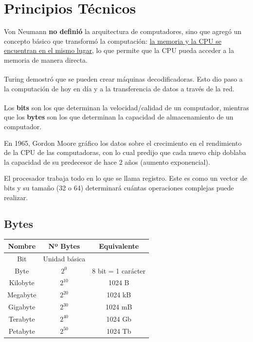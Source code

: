 \documentclass{templateNote}
\begin{document}
\section{Principios Técnicos}
\noindent Von Neumann \textbf{no definió} la arquitectura de computadores, sino que agregó un concepto básico que transformó la computación: \underline{la memoria y la CPU se encuentran en el mismo lugar}, lo que permite que la CPU pueda acceder a la memoria de manera directa. 
\\\\
Turing demostró que se pueden crear máquinas decodificadoras. Esto dio paso a la computación de hoy en día y a la transferencia de datos a través de la red.
\\\\
Los \textbf{bits} son los que determinan la velocidad/calidad de un computador, mientras que los \textbf{bytes} son los que determinan la capacidad de almacenamiento de un computador.

\begin{tcolorbox}[colback=blue!5!white,colframe=blue!75!black,title=Ley de Moore]
En 1965, Gordon Moore gráfico los datos sobre el crecimiento en el rendimiento de la CPU de las computadoras, con lo cual predijo que cada nuevo chip doblaba la capacidad de su predecesor de hace 2 años (aumento exponencial).
\end{tcolorbox}

\noindent El procesador trabaja todo en lo que se llama registro. Este es como un vector de bits y su tamaño (32 o 64) determinará cuántas operaciones complejas puede realizar.

\subsection{Bytes}
\begin{table} [H]
    \centering
        \renewcommand{\arraystretch}{1.5} %
        \begin{tabular}{|c|c|c|}
            \hline
            \textbf{Nombre} & \textbf{Nº Bytes} & \textbf{Equivalente}\\
            \hline
            Bit & Unidad básica &\\
            \hline
            Byte & $\displaystyle 2^0$ & 8 bit = 1 carácter \\
            \hline
            Kilobyte & $\displaystyle 2^{10}$ & 1024 B \\
            \hline
            Megabyte & $\displaystyle 2^{20}$ & 1024 kB \\
            \hline
            Gigabyte & $\displaystyle 2^{30}$ & 1024 mB \\
            \hline
            Terabyte & $\displaystyle 2^{40}$ & 1024 Gb \\
            \hline
            Petabyte & $\displaystyle 2^{50}$ & 1024 Tb \\
            \hline
        \end{tabular}
    \label{tab:componentes}
\end{table}
\end{document}
